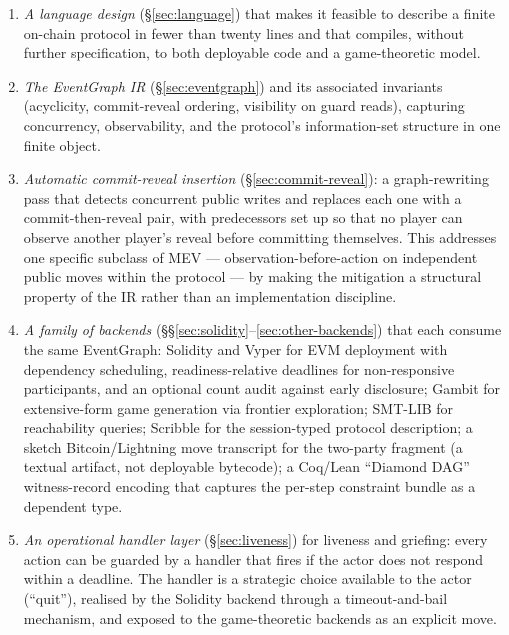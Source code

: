 \begin{enumerate}\itemsep2pt
\item \emph{A language design} (\S\ref{sec:language}) that makes it
  feasible to describe a finite on-chain protocol in fewer than
  twenty lines and that compiles, without further specification,
  to both deployable code and a game-theoretic model.

\item \emph{The EventGraph IR} (\S\ref{sec:eventgraph}) and its
  associated invariants (acyclicity, commit-reveal ordering,
  visibility on guard reads), capturing concurrency, observability,
  and the protocol's information-set structure in one finite
  object.

\item \emph{Automatic commit-reveal insertion}
  (\S\ref{sec:commit-reveal}): a graph-rewriting pass that detects
  concurrent public writes and replaces each one with a
  commit-then-reveal pair, with predecessors set up so that no
  player can observe another player's reveal before committing
  themselves.  This addresses one specific subclass of MEV ---
  observation-before-action on independent public moves within the
  protocol --- by making the mitigation a structural property of
  the IR rather than an implementation discipline.

\item \emph{A family of backends} (\S\S\ref{sec:solidity}--\ref{sec:other-backends})
  that each consume the same EventGraph: Solidity and Vyper for
  EVM deployment with dependency scheduling, readiness-relative
  deadlines for non-responsive participants, and an optional count
  audit against early disclosure; Gambit
  for extensive-form game generation via frontier exploration;
  SMT-LIB for reachability queries; Scribble for the session-typed
  protocol description; a sketch Bitcoin/Lightning move transcript
  for the two-party fragment (a textual artifact, not deployable
  bytecode); a Coq/Lean ``Diamond DAG'' witness-record encoding
  that captures the per-step constraint bundle as a dependent
  type.

\item \emph{An operational handler layer}
  (\S\ref{sec:liveness}) for liveness and griefing: every action
  can be guarded by a handler that fires if the actor does not
  respond within a deadline.  The handler is a strategic choice
  available to the actor (``quit''), realised by the Solidity
  backend through a timeout-and-bail mechanism, and exposed to the
  game-theoretic backends as an explicit move.


\end{enumerate}
